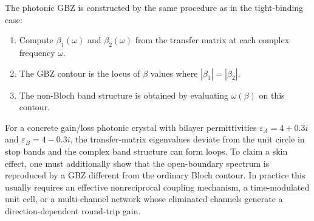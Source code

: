 The photonic GBZ is constructed by the same procedure as in the
tight-binding case:
\begin{enumerate}
 \item Compute $\beta_1(\omega)$ and $\beta_2(\omega)$ from the
 transfer matrix at each complex frequency $\omega$.
 \item The GBZ contour is the locus of $\beta$ values where
 $|\beta_1| = |\beta_2|$.
 \item The non-Bloch band structure is obtained by evaluating
 $\omega(\beta)$ on this contour.
\end{enumerate}
For a concrete gain/loss photonic crystal with bilayer permittivities
$\varepsilon_A = 4 + 0.3i$ and $\varepsilon_B = 4 - 0.3i$, the
transfer-matrix eigenvalues deviate from the unit circle in stop bands
and the complex band structure can form loops. To claim a skin effect,
one must additionally show that the open-boundary spectrum is reproduced
by a GBZ different from the ordinary Bloch contour. In practice this
usually requires an effective nonreciprocal coupling mechanism, a
time-modulated unit cell, or a multi-channel network whose eliminated
channels generate a direction-dependent round-trip gain.
